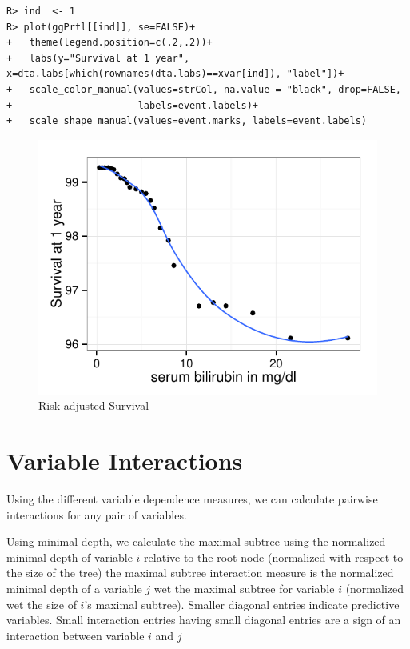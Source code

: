 \documentclass[nojss]{jss}\usepackage[]{graphicx}\usepackage[]{color}
\makeatletter
\def\maxwidth{ %
  \ifdim\Gin@nat@width>\linewidth
    \linewidth
  \else
    \Gin@nat@width
  \fi
}
\newenvironment{kframe}{%
 \def\at@end@of@kframe{}%
 \ifinner\ifhmode%
  \def\at@end@of@kframe{\end{minipage}}%
  \begin{minipage}{\columnwidth}%
 \fi\fi%
 \def\FrameCommand##1{\hskip\@totalleftmargin \hskip-\fboxsep
 \colorbox{shadecolor}{##1}\hskip-\fboxsep
     \hskip-\linewidth \hskip-\@totalleftmargin \hskip\columnwidth}%
 \MakeFramed {\advance\hsize-\width
   \@totalleftmargin\z@ \linewidth\hsize
   \@setminipage}}%
 {\par\unskip\endMakeFramed%
 \at@end@of@kframe}
\newenvironment{knitrout}{}{} %
\makeatother
\begin{document}
\begin{knitrout}\footnotesize
{}\color{fgcolor}\begin{kframe}
\begin{verbatim}
R> ind  <- 1
R> plot(ggPrtl[[ind]], se=FALSE)+
+   theme(legend.position=c(.2,.2))+
+   labs(y="Survival at 1 year", x=dta.labs[which(rownames(dta.labs)==xvar[ind]), "label"])+
+   scale_color_manual(values=strCol, na.value = "black", drop=FALSE,
+                      labels=event.labels)+
+   scale_shape_manual(values=event.marks, labels=event.labels)
\end{verbatim}
\end{kframe}\begin{figure}[!htpb]

{\centering \includegraphics[width=\maxwidth]{figure/rfs-pbc-partial-bili-1} 

}

\caption[Risk adjusted Survival]{Risk adjusted Survival\label{fig:pbc-partial-bili}}
\end{figure}


\end{knitrout}

\section{Variable Interactions}\label{S:interactions}
Using the different variable dependence measures, we can calculate pairwise interactions for any pair of variables. 

Using minimal depth, we calculate the maximal subtree using the normalized minimal depth of variable $i$ relative to the root node (normalized with respect to the size of the tree) the maximal subtree interaction measure  is the normalized minimal depth of a variable $j$ wet the maximal subtree for variable $i$ (normalized wet the size of $i$'s maximal subtree). Smaller diagonal entries indicate predictive variables. Small interaction entries having small diagonal entries are a sign of an interaction between variable $i$ and $j$~\citep{Ishwaran_HighDimension:2010,Ishwaran_HighDimension:2011} 
\end{document}
